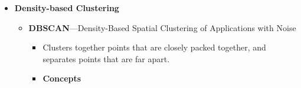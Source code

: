 \begin{multicols}{2}
\begin{itemize}
\begin{itemize}
    \begin{itemize}
        \item
      \textbf{Maximim / complete linkage}---distance between two
      clusters defined as max value of all pairwise distances between
      elements in the clusters.
    \item
      \textbf{Minimum / single linkage}---distance between two clusters
      defined as minimum value of all pairwise distances between
      elements in clusters.
    \item
      \textbf{Average linkage}---distance between two clusters defined
      as average distance between their elements.
    \item
      \textbf{Centroid or mean linkage}---distance between two clusters
      defined as distance between centroid for cluster 1 and centroid
      for cluster 2.
    \item
      \textbf{Ward linkage}---distance between two clusters is how much
      sum of squares increases when merged.
    \end{itemize}
  \item
    \textbf{BIRCH}--Balanced Iterative Reducing and Clustering using
    Hierarchies

    \begin{itemize}
        \item
      Clustering method using CF (Clustering Feature) tree to store
      subclusters. Designed for large datasets.
    \item
      Each entry in CF tree contains info about one cluster.
    \end{itemize}
  \end{itemize}
\item
  \textbf{Density-based Clustering}

  \begin{itemize}
    \item
    \textbf{DBSCAN}---Density-Based Spatial Clustering of Applications
    with Noise

    \begin{itemize}
        \item
      Clusters together points that are closely packed together, and
      separates points that are far apart.
    \item
      \textbf{Concepts}


\end{itemize}
\end{itemize}
\end{itemize}
\end{multicols}
